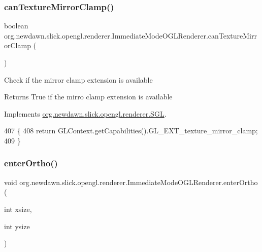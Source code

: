\subsubsection{\texorpdfstring{can\+Texture\+Mirror\+Clamp()}{canTextureMirrorClamp()}}
{\footnotesize\ttfamily boolean org.\+newdawn.\+slick.\+opengl.\+renderer.\+Immediate\+Mode\+O\+G\+L\+Renderer.\+can\+Texture\+Mirror\+Clamp (\begin{DoxyParamCaption}{ }\end{DoxyParamCaption})\hspace{0.3cm}{\ttfamily [inline]}}

Check if the mirror clamp extension is available

\begin{DoxyReturn}{Returns}
True if the mirro clamp extension is available 
\end{DoxyReturn}


Implements \mbox{\hyperlink{interfaceorg_1_1newdawn_1_1slick_1_1opengl_1_1renderer_1_1_s_g_l_a57e486bcf65ca2576b735e7b4fcd654b}{org.\+newdawn.\+slick.\+opengl.\+renderer.\+S\+GL}}.


\begin{DoxyCode}
407                                            \{
408         \textcolor{keywordflow}{return} GLContext.getCapabilities().GL\_EXT\_texture\_mirror\_clamp;
409     \}
\end{DoxyCode}
\mbox{\label{classorg_1_1newdawn_1_1slick_1_1opengl_1_1renderer_1_1_immediate_mode_o_g_l_renderer_a80452e864cb2656b20684c65dc219014}} 
\subsubsection{\texorpdfstring{enter\+Ortho()}{enterOrtho()}}
{\footnotesize\ttfamily void org.\+newdawn.\+slick.\+opengl.\+renderer.\+Immediate\+Mode\+O\+G\+L\+Renderer.\+enter\+Ortho (\begin{DoxyParamCaption}\item[{int}]{xsize,  }\item[{int}]{ysize }\end{DoxyParamCaption})\hspace{0.3cm}{\ttfamily [inline]}}

